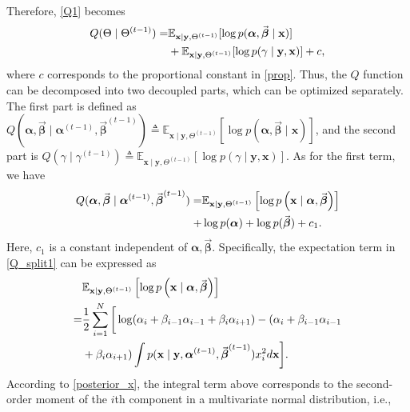 \documentclass[lettersize,journal]{IEEEtran}
\theoremstyle{remark}
\begin{document}
Therefore, \eqref{Q1} becomes 
\begin{align}
		Q(\Theta \mid \Theta^{(t-1)})=& \mathbb{E}_{\mathbf{x} \mid \mathbf{y}, \Theta^{(t-1)}} [\log p(\boldsymbol{\alpha},\vec{\boldsymbol{\beta}} \mid \mathbf{x})]\notag\\
		&+\mathbb{E}_{\mathbf{x} \mid \mathbf{y}, \Theta^{(t-1)}} [\log p(\gamma \mid \mathbf{y}, \mathbf{x})]+c,
\end{align}
where $c$ corresponds to the proportional constant  in \eqref{prop}. Thus, the \( Q \) function can be decomposed into two decoupled parts, which can be optimized separately. The first part is defined as \( Q(\boldsymbol{\alpha}, \vec{\boldsymbol{\beta}} \mid \boldsymbol{\alpha}^{(t-1)}, \vec{\boldsymbol{\beta}}^{(t-1)})\triangleq
\mathbb{E}_{\mathbf{x} \mid \mathbf{y}, \Theta^{(t-1)}} [\log p(\boldsymbol{\alpha},\vec{\boldsymbol{\beta}} \mid \mathbf{x})] \), and the second part is  \( Q(\gamma \mid \gamma^{(t-1)})\triangleq
\mathbb{E}_{\mathbf{x} \mid \mathbf{y}, \Theta^{(t-1)}} [\log p(\gamma \mid \mathbf{y}, \mathbf{x})] \). 
As for the first term, we have 
\begin{align}
	Q(\boldsymbol{\alpha}, \vec{\boldsymbol{\beta}} \mid \boldsymbol{\alpha}^{(t-1)}, \vec{\boldsymbol{\beta}}^{(t-1)})
	=&\mathbb{E}_{\mathbf{x} \mid \mathbf{y}, \Theta^{(t-1)}}\left[\log 
	p\left(\mathbf{x} \mid \boldsymbol{\alpha}, \vec{\boldsymbol{\beta}} \right)  \right]\notag\\
	+&\log p(\boldsymbol{\alpha})+\log p(\vec{\boldsymbol{\beta}})+c_1.\label{Q_split1}
\end{align}
Here, $c_1$ is a constant independent of $\boldsymbol{\alpha}, \vec{\boldsymbol{\beta}}$. Specifically, the expectation term in \eqref{Q_split1} can be expressed as
\allowdisplaybreaks
\begin{align}
	&\mathbb{E}_{\mathbf{x} \mid \mathbf{y}, \Theta^{(t-1)}}\left[\log 
	p\left(\mathbf{x} \mid \boldsymbol{\alpha}, \vec{\boldsymbol{\beta}} \right)  \right] \notag\\
	=& \frac{1}{2} \sum_{i=1}^{N} \bigg[ \log (\alpha_i + \beta_{i-1} \alpha_{i-1} + \beta_i \alpha_{i+1})  - (\alpha_i + \beta_{i-1} \alpha_{i-1}  \notag\\
	&+ \beta_i \alpha_{i+1}) 
	\int p(\mathbf{x}\mid \mathbf{y}, \boldsymbol{\alpha}^{(t-1)}, \vec{\boldsymbol{\beta}}^{(t-1)}) x_i^2 d \mathbf{x} \bigg].\label{simQ1}
\end{align}
According to \eqref{posterior_x}, the integral term above corresponds to the second-order moment of the \( i \)th component in a multivariate normal distribution, i.e.,
\end{document}
